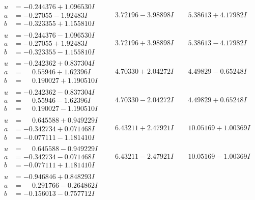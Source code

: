 \documentclass[1p]{elsarticle_modified}
\theoremstyle{definition}
\begin{document}
$$\begin{array}{c|c|c}
\begin{aligned}
u &= -0.244376 + 1.096530 I \\
a &= -0.27055 - 1.92483 I \\
b &= -0.323355 + 1.155810 I\end{aligned}
 & \phantom{-}3.72196 - 3.98898 I & \phantom{-}5.38613 + 4.17982 I \\ \hline\begin{aligned}
u &= -0.244376 - 1.096530 I \\
a &= -0.27055 + 1.92483 I \\
b &= -0.323355 - 1.155810 I\end{aligned}
 & \phantom{-}3.72196 + 3.98898 I & \phantom{-}5.38613 - 4.17982 I \\ \hline\begin{aligned}
u &= -0.242362 + 0.837304 I \\
a &= \phantom{-}0.55946 + 1.62396 I \\
b &= \phantom{-}0.190027 + 1.190510 I\end{aligned}
 & \phantom{-}4.70330 + 2.04272 I & \phantom{-}4.49829 - 0.65248 I \\ \hline\begin{aligned}
u &= -0.242362 - 0.837304 I \\
a &= \phantom{-}0.55946 - 1.62396 I \\
b &= \phantom{-}0.190027 - 1.190510 I\end{aligned}
 & \phantom{-}4.70330 - 2.04272 I & \phantom{-}4.49829 + 0.65248 I \\ \hline\begin{aligned}
u &= \phantom{-}0.645588 + 0.949229 I \\
a &= -0.342734 + 0.071468 I \\
b &= -0.077111 - 1.181410 I\end{aligned}
 & \phantom{-}6.43211 + 2.47921 I & \phantom{-}10.05169 + 1.00369 I \\ \hline\begin{aligned}
u &= \phantom{-}0.645588 - 0.949229 I \\
a &= -0.342734 - 0.071468 I \\
b &= -0.077111 + 1.181410 I\end{aligned}
 & \phantom{-}6.43211 - 2.47921 I & \phantom{-}10.05169 - 1.00369 I \\ \hline\begin{aligned}
u &= -0.946846 + 0.848293 I \\
a &= \phantom{-}0.291766 - 0.264862 I \\
b &= -0.156013 - 0.757712 I\end{aligned}

\end{array}$$
\end{document}
